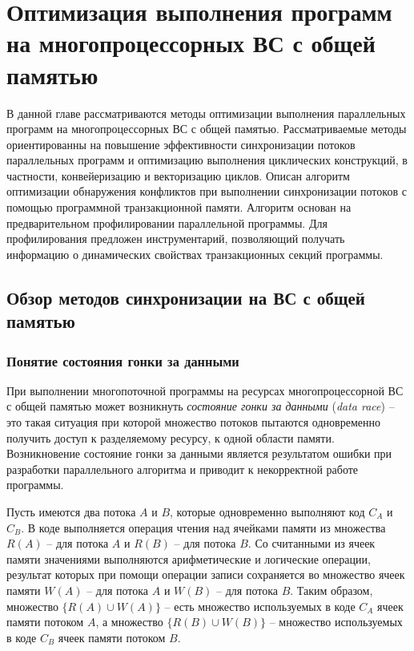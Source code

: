 
\chapter{Оптимизация выполнения программ на многопроцессорных ВС с общей памятью} \label{part3}
В данной главе рассматриваются методы оптимизации выполнения параллельных программ на многопроцессорных ВС с общей памятью. Рассматриваемые методы ориентированны на повышение эффективности синхронизации потоков параллельных программ и оптимизацию выполнения циклических конструкций, в частности, конвейеризацию и векторизацию циклов. Описан алгоритм оптимизации обнаружения конфликтов при выполнении синхронизации потоков с помощью программной транзакционной памяти. Алгоритм основан на предварительном профилировании параллельной программы. Для профилирования предложен инструментарий, позволяющий получать информацию о динамических свойствах транзакционных секций программы.

\section{Обзор методов синхронизации на ВС с общей памятью}
\subsection{Понятие состояния гонки за данными}
При выполнении многопоточной программы на ресурсах многопроцессорной ВС с общей памятью может возникнуть \textit{состояние гонки за данными} (\textit{data race}) -- это такая ситуация при которой множество потоков пытаются одновременно получить доступ к разделяемому ресурсу, к одной области памяти. Возникновение состояние гонки за данными является результатом ошибки при разработки параллельного алгоритма и приводит к некорректной работе программы.

Пусть имеются два потока $A$ и $B$, которые одновременно выполняют код $C_{A}$ и $C_{B}$. В коде выполняется операция чтения над ячейками памяти из множества $R(A)$ -- для потока $A$ и $R(B)$ -- для потока $B$. Со считанными из ячеек памяти значениями выполняются арифметические и логические операции, результат которых при помощи операции записи сохраняется во множество ячеек памяти $W(A)$ -- для потока $A$ и $W(B)$ -- для потока $B$. Таким образом, множество $\{R(A) \cup W(A) \}$ -- есть множество используемых в коде $C_{A}$ ячеек памяти потоком $A$, а множество $\{R(B) \cup W(B) \}$ -- множество используемых в коде $C_{B}$ ячеек памяти потоком $B$.

